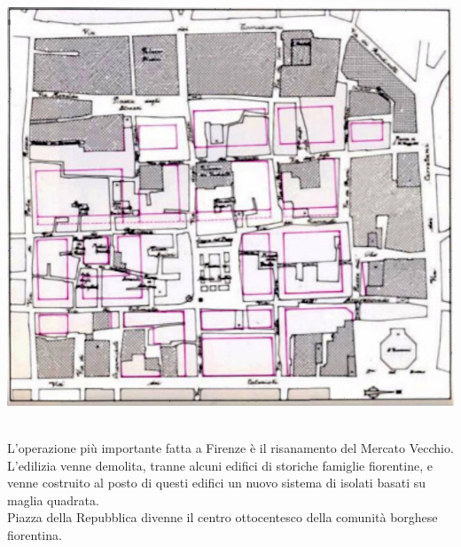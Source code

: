 \documentclass[a4paper,12pt, oneside]{book}
\begin{document}
  \begin{center}
  	\includegraphics[width=0.6\linewidth]{"immagini/risanamento mercato vecchio"}
  	\label{fig:risanamento mercato vecchio}
  \end{center}
  \leavevmode\\
  L'operazione più importante fatta a Firenze è il risanamento del Mercato Vecchio.\\ L'edilizia venne demolita, tranne alcuni edifici di storiche famiglie fiorentine, e venne costruito al posto di questi edifici un nuovo sistema di isolati basati su maglia quadrata.\\ Piazza della Repubblica divenne il centro ottocentesco della comunità borghese fiorentina.\\
\end{document}

